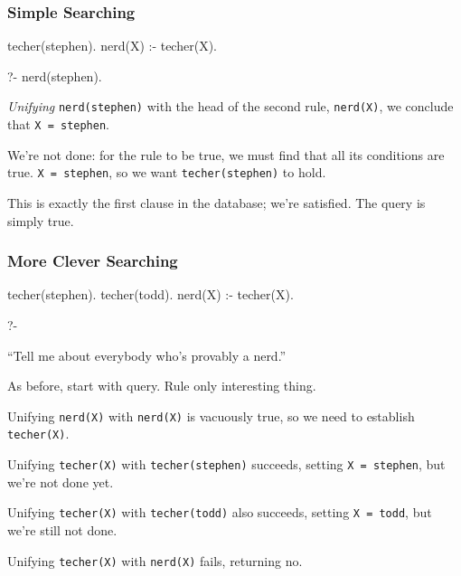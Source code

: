 \documentclass{plt}
\begin{document}
\begin{frame}[fragile=singleslide]
  \frametitle{Simple Searching}

\begin{prolog}
techer(stephen).
nerd(X) :- techer(X).
\end{prolog}

\begin{minipage}{0.3\textwidth}
\begin{interactive}
?- nerd(stephen).
\end{interactive}
\end{minipage}

\emph{Unifying} \texttt{nerd(stephen)} with the head of the second
rule, \texttt{nerd(X)}, we conclude that \texttt{X = stephen}.

We're not done: for the rule to be true, we must find that all its
conditions are true.  \texttt{X = stephen}, so we want
\texttt{techer(stephen)} to hold.

This is exactly the first clause in the database; we're satisfied.
The query is simply true.

\end{frame}

\begin{frame}[fragile=singleslide]
  \frametitle{More Clever Searching}

\begin{prolog}
techer(stephen).
techer(todd).
nerd(X) :- techer(X).
\end{prolog}

\begin{minipage}{0.3\textwidth}
\begin{interactive}
?- 
\end{interactive}
\end{minipage}

``Tell me about everybody who's provably a nerd.''

As before, start with query.  Rule only interesting thing.

Unifying \texttt{nerd(X)} with \texttt{nerd(X)} is vacuously true, so
we need to establish \texttt{techer(X)}.

Unifying \texttt{techer(X)} with \texttt{techer(stephen)} succeeds,
setting \texttt{X = stephen}, but we're not done yet.

Unifying \texttt{techer(X)} with \texttt{techer(todd)} also succeeds,
setting \texttt{X = todd}, but we're still not done.

Unifying \texttt{techer(X)} with \texttt{nerd(X)} fails, returning no.

\end{frame}
\end{document}

